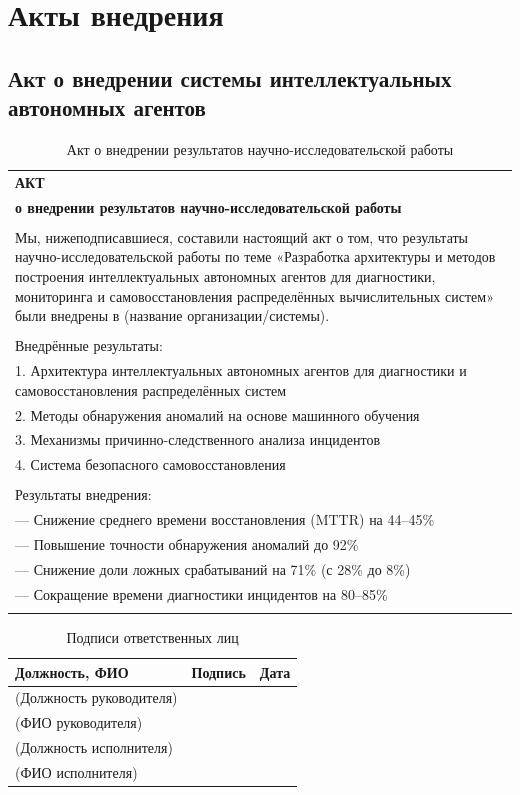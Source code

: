 \chapter{Акты внедрения}

\section{Акт о внедрении системы интеллектуальных автономных агентов}

\begin{table}[H]
\centering
\caption{Акт о внедрении результатов научно-исследовательской работы}
\label{tab:act_implementation}
\small
\begin{tabularx}{\textwidth}{|X|}
\hline
\textbf{АКТ} \\
\textbf{о внедрении результатов научно-исследовательской работы} \\
\hline
\\
Мы, нижеподписавшиеся, составили настоящий акт о том, что результаты научно-исследовательской работы по теме «Разработка архитектуры и методов построения интеллектуальных автономных агентов для диагностики, мониторинга и самовосстановления распределённых вычислительных систем» были внедрены в (название организации/системы). \\
\\
Внедрённые результаты: \\
1. Архитектура интеллектуальных автономных агентов для диагностики и самовосстановления распределённых систем \\
2. Методы обнаружения аномалий на основе машинного обучения \\
3. Механизмы причинно-следственного анализа инцидентов \\
4. Система безопасного самовосстановления \\
\\
Результаты внедрения: \\
--- Снижение среднего времени восстановления (MTTR) на 44--45\% \\
--- Повышение точности обнаружения аномалий до 92\% \\
--- Снижение доли ложных срабатываний на 71\% (с 28\% до 8\%) \\
--- Сокращение времени диагностики инцидентов на 80--85\% \\
\\
\hline
\end{tabularx}
\end{table}

\begin{table}[H]
\centering
\caption{Подписи ответственных лиц}
\label{tab:act_signatures}
\small
\begin{tabularx}{\textwidth}{|X|p{2cm}|X|}
\hline
\textbf{Должность, ФИО} & \textbf{Подпись} & \textbf{Дата} \\
\hline
(Должность руководителя) & & \\
(ФИО руководителя) & & \\
\hline
(Должность исполнителя) & & \\
(ФИО исполнителя) & & \\
\hline
\end{tabularx}
\end{table}

